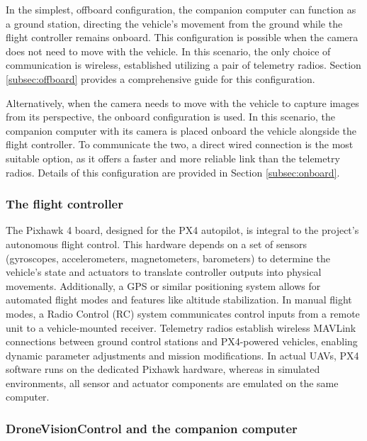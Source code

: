 In the simplest, offboard configuration, the companion computer can function as a ground station, directing the vehicle's movement from the ground while the flight controller remains onboard. This configuration is possible when the camera does not need to move with the vehicle. In this scenario, the only choice of communication is wireless, established utilizing a pair of telemetry radios. Section \ref{subsec:offboard} provides a comprehensive guide for this configuration.

Alternatively, when the camera needs to move with the vehicle to capture images from its perspective, the onboard configuration is used. In this scenario, the companion computer with its camera is placed onboard the vehicle alongside the flight controller. To communicate the two, a direct wired connection is the most suitable option, as it offers a faster and more reliable link than the telemetry radios. Details of this configuration are provided in Section \ref{subsec:onboard}.

\subsubsection{The flight controller}

The Pixhawk 4 board, designed for the PX4 autopilot, is integral to the project's autonomous flight control. This hardware depends on a set of sensors (gyroscopes, accelerometers, magnetometers, barometers) to determine the vehicle's state and actuators to translate controller outputs into physical movements. Additionally, a GPS or similar positioning system allows for automated flight modes and features like altitude stabilization.
In manual flight modes, a Radio Control (RC) system communicates control inputs from a remote unit to a vehicle-mounted receiver. Telemetry radios establish wireless MAVLink connections between ground control stations and PX4-powered vehicles, enabling dynamic parameter adjustments and mission modifications.
In actual UAVs, PX4 software runs on the dedicated Pixhawk hardware, whereas in simulated environments, all sensor and actuator components are emulated on the same computer.


\subsubsection{DroneVisionControl and the companion computer}

